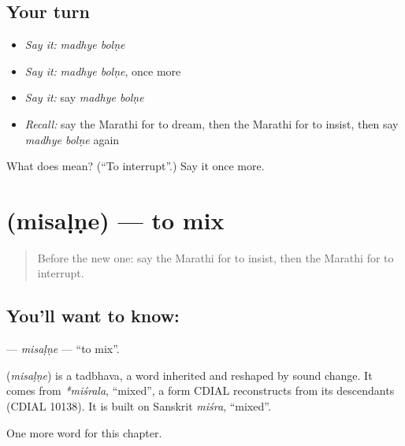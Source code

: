 \subsection*{Your turn}
\begin{itemize}
\raggedright
  \item \emph{Say it:} \emph{madhye bolṇe}
  \item \emph{Say it:} \emph{madhye bolṇe}, once more
  \item \emph{Say it:} say \emph{madhye bolṇe}
  \item \emph{Recall:} say the Marathi for to dream, then the Marathi for to insist, then say \emph{madhye bolṇe} again
\end{itemize}

\begin{tcolorbox}[breakable,colback=teal!4,colframe=teal!35!black,title={Before you move on}]
What does   mean? (\textquotedblleft{}To interrupt\textquotedblright{}.) Say it once more.
\end{tcolorbox}
\section[\texorpdfstring{\mr{मिसळणे} (misaḷṇe)}{मिसळणे (misaḷṇe)}]{ (misaḷṇe) — to mix}

\label{lesson:MR-C255-misalne}



\begin{quote}
Before the new one: say the Marathi for to insist, then the Marathi for to interrupt.
\end{quote}

\subsection*{You'll want to know: }
\textbf{} — \emph{misaḷṇe} — \textquotedblleft{}to mix\textquotedblright{}.

\begin{cousinweb}
\textbf{} (\emph{misaḷṇe}) is a tadbhava, a word inherited and reshaped by sound change. It comes from \emph{*miśrala}, \textquotedblleft{}mixed\textquotedblright{}, a form CDIAL reconstructs from its descendants (CDIAL 10138). It is built on Sanskrit \emph{miśra}, \textquotedblleft{}mixed\textquotedblright{}.
\end{cousinweb}

\begin{grammarlens}[title={What you've built}]
One more word for this chapter.
\end{grammarlens}


